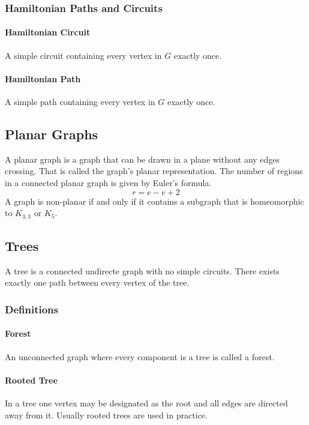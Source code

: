 \documentclass[a4paper, 10pt]{article}
\begin{document}
\subsubsection{Hamiltonian Paths and Circuits}
\paragraph{Hamiltonian Circuit}
A simple circuit containing every vertex in \(G\) exactly once.
\paragraph{Hamiltonian Path}
A simple path containing every vertex in \(G\) exactly once.

\subsection{Planar Graphs}
A planar graph is a graph that can be drawn in a plane without any edges crossing. That is called the graph's planar representation. The number of regions in a connected planar graph is given by Euler's formula.
\[ r=e-v+2 \]
A graph is non-planar if and only if it contains a subgraph that is homeomorphic to \(K_{3,3}\) or \(K_5\).

\subsection{Trees}
A tree is a connected undirecte graph with no simple circuits. There exists exactly one path between every vertex of the tree.

\subsubsection{Definitions}
\paragraph{Forest}
An unconnected graph where every component is a tree is called a forest.
\paragraph{Rooted Tree}
In a tree one vertex may be designated as the root and all edges are directed away from it. Usually rooted trees are used in practice.
\end{document}
